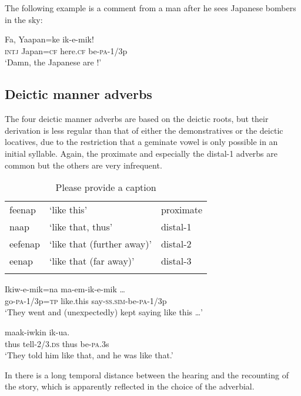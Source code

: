 The following example is a comment from a man after he sees Japanese bombers in the sky:

\ea%
\label{ex:3:x1572}
\gll Fa, Yaapan=ke  ik-e-mik! \\
\textsc{intj} Japan=\textsc{cf} here.\textsc{cf} be-\textsc{pa}-1/3p\\
\glt`Damn, the Japanese are !'
\z

\subsection{Deictic manner adverbs}\label{sec:3:y:x}
{}
The four deictic manner adverbs are based on the deictic roots, but their derivation is less regular than that of either the demonstratives or the deictic locatives, due to the restriction that a geminate vowel is only possible in an initial syllable. Again, the proximate and especially the distal-1 adverbs are common but the others are very infrequent.

\begin{table}
\caption{Please provide a caption}
\label{} 
\begin{tabular}{lll}
\mytoprule
feenap &`like this' &proximate\\
naap &`like that, thus' &distal-1\\
eefenap &`like that (further away)' &distal-2\\
eenap &`like that (far away)' &distal-3\\
\mybottomrule
\end{tabular}
\end{table}


\ea%
\label{ex:3:x701}
\gll Ikiw-e-mik=na  ma-em-ik-e-mik {\dots} \\
go-\textsc{pa}-1/3p=\textsc{tp} like.this say-\textsc{ss}.\textsc{sim}-be-\textsc{pa}-1/3p\\
\glt`They went and (unexpectedly) kept saying like this {\dots}'
\z

\ea%
\label{ex:3:x702}
\gll {} maak-iwkin  ik-ua. \\
thus tell-2/3.\textsc{ds} thus be-\textsc{pa}.3s\\
\glt`They told him like that, and he was like that.'
\z

In  there is a long temporal distance between the hearing and the recounting of the story, which is apparently reflected in the choice of the adverbial.

